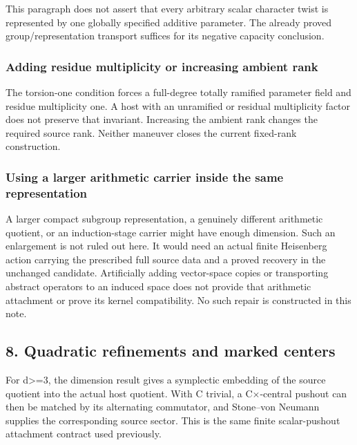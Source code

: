 This paragraph does not assert that every arbitrary scalar character
twist is represented by one globally specified additive parameter. The
already proved group/representation transport suffices for its negative
capacity conclusion.

\hypertarget{dyadic_capacity-adding-residue-multiplicity-or-increasing-ambient-rank}{%
\subsubsection{Adding residue multiplicity or increasing ambient
rank}\label{dyadic_capacity-adding-residue-multiplicity-or-increasing-ambient-rank}}

The torsion-one condition forces a full-degree totally ramified
parameter field and residue multiplicity one. A host with an unramified
or residual multiplicity factor does not preserve that invariant.
Increasing the ambient rank changes the required source rank. Neither
maneuver closes the current fixed-rank construction.

\hypertarget{dyadic_capacity-using-a-larger-arithmetic-carrier-inside-the-same-representation}{%
\subsubsection{Using a larger arithmetic carrier inside the same
representation}\label{dyadic_capacity-using-a-larger-arithmetic-carrier-inside-the-same-representation}}

A larger compact subgroup representation, a genuinely different
arithmetic quotient, or an induction-stage carrier might have enough
dimension. Such an enlargement is not ruled out here. It would need an
actual finite Heisenberg action carrying the prescribed full source data
and a proved recovery in the unchanged candidate. Artificially adding
vector-space copies or transporting abstract operators to an induced
space does not provide that arithmetic attachment or prove its kernel
compatibility. No such repair is constructed in this note.

\hypertarget{dyadic_capacity-quadratic-refinements-and-marked-centers}{%
\subsection{8. Quadratic refinements and marked
centers}\label{dyadic_capacity-quadratic-refinements-and-marked-centers}}

For d\textgreater=3, the dimension result gives a symplectic embedding
of the source quotient into the actual host quotient. With C trivial, a
C×-central pushout can then be matched by its alternating commutator,
and Stone--von Neumann supplies the corresponding source sector. This is
the same finite scalar-pushout attachment contract used previously.

